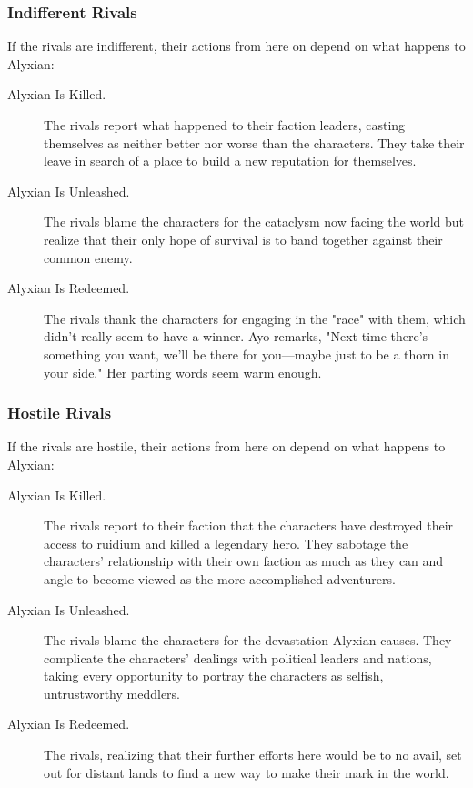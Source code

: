 \documentclass[a4paper, 11pt, bg=full, twocolumn, nooutline]{dndbook}
\begin{document}
\subsubsection{Indifferent Rivals}

If the rivals are indifferent, their actions from here on depend on what happens to Alyxian:

\begin{description}
\item[Alyxian Is Killed.] The rivals report what happened to their faction leaders, casting themselves as neither better nor worse than the characters. They take their leave in search of a place to build a new reputation for themselves.
\item[Alyxian Is Unleashed.] The rivals blame the characters for the cataclysm now facing the world but realize that their only hope of survival is to band together against their common enemy.
\item[Alyxian Is Redeemed.] The rivals thank the characters for engaging in the "race" with them, which didn't really seem to have a winner. Ayo remarks, "Next time there's something you want, we'll be there for you---maybe just to be a thorn in your side." Her parting words seem warm enough.
\end{description}

\subsubsection{Hostile Rivals}

If the rivals are hostile, their actions from here on depend on what happens to Alyxian:

\begin{description}
\item[Alyxian Is Killed.] The rivals report to their faction that the characters have destroyed their access to ruidium and killed a legendary hero. They sabotage the characters' relationship with their own faction as much as they can and angle to become viewed as the more accomplished adventurers.
\item[Alyxian Is Unleashed.] The rivals blame the characters for the devastation Alyxian causes. They complicate the characters' dealings with political leaders and nations, taking every opportunity to portray the characters as selfish, untrustworthy meddlers.
\item[Alyxian Is Redeemed.] The rivals, realizing that their further efforts here would be to no avail, set out for distant lands to find a new way to make their mark in the world.
\end{description}
\end{document}
